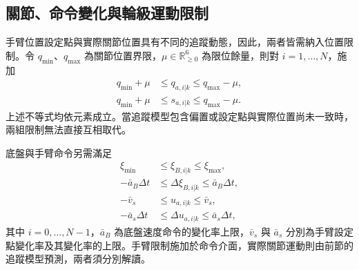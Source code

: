 \subsection{關節、命令變化與輪級運動限制}
\label{subsec:joint_command_wheel_constraints}

手臂位置設定點與實際關節位置具有不同的追蹤動態，因此，兩者皆需納入位置限制。令 $q_{\min}$、$q_{\max}$ 為關節位置界限，$\mu\in\mathbb{R}_{\geq0}^{6}$ 為限位餘量，則對 $i=1,\ldots,N$，施加
\begin{equation}
    \begin{aligned}
        q_{\min}+\mu
        &\leq q_{a,i|k}\leq q_{\max}-\mu, \\
        q_{\min}+\mu
        &\leq s_{a,i|k}\leq q_{\max}-\mu.
    \end{aligned}
    \label{eq:ch3_joint_setpoint_limits}
\end{equation}
上述不等式均依元素成立。當追蹤模型包含偏置或設定點與實際位置尚未一致時，兩組限制無法直接互相取代。

底盤與手臂命令另需滿足
\begin{equation}
    \begin{aligned}
        \xi_{\min}
        &\leq\xi_{B,i|k}\leq\xi_{\max}, \\
        -\bar{a}_B\Delta t
        &\leq\Delta\xi_{B,i|k}\leq\bar{a}_B\Delta t, \\
        -\bar{v}_s
        &\leq u_{a,i|k}\leq\bar{v}_s, \\
        -\bar{a}_s\Delta t
        &\leq\Delta u_{a,i|k}\leq\bar{a}_s\Delta t,
    \end{aligned}
    \label{eq:ch3_command_rate_limits}
\end{equation}
其中 $i=0,\ldots,N-1$，$\bar{a}_B$ 為底盤速度命令的變化率上限，$\bar{v}_s$ 與 $\bar{a}_s$ 分別為手臂設定點變化率及其變化率的上限。手臂限制施加於命令介面，實際關節運動則由前節的追蹤模型預測，兩者須分別解讀。

